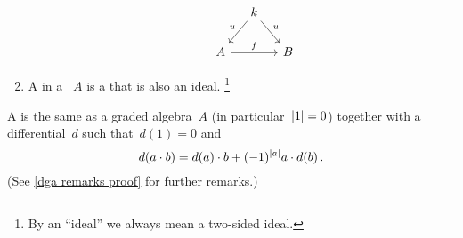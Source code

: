 \documentclass[a4paper,10pt,headings=standardclasses]{scrartcl}
\begin{document}
\begin{definition}
\begin{enumerate}
\[        \qquad
        \begin{tikzcd}[column sep = small]
          {}
          &
          k
          \arrow{dl}[above left]{u}
          \arrow{dr}[above right]{u}
          &
          {}
          \\
          A
          \arrow{rr}[above]{f}
          &
          {}
          &
          B
        \end{tikzcd}
      \]
    \item
      A  in a {\dga}~$A$ is a {\dgsub} that is also an ideal.%
      \footnote{By an \enquote{ideal} we always mean a two-sided ideal.}
  \end{enumerate}
\end{definition}

\begin{remark}
  \label{dga remarks}
  A {\dga} is the same as a graded algebra~$A$ (in particular~$\lvert1\rvert = 0$) together with a differential~$d$ such that~$d(1) = 0$ and
  \begin{equation}
  \label{compatibility of multiplication with differential}
    d(a \cdot b)
    =
    d(a) \cdot b + (-1)^{\lvert a\rvert} a \cdot d(b) \,.
  \end{equation}
  (See \cref{dga remarks proof} for further remarks.)
\end{remark}
\end{document}
